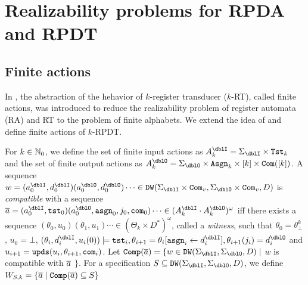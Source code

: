 \section{Realizability problems for RPDA and RPDT}


\subsection{Finite actions}
In \cite{EFR19}, the abstraction of the hehavior of $k$-register transducer ($k$-RT), called finite actions, was introduced
to reduce the realizability problem of register automata (RA) and RT to
the problem of finite alphabets.
We extend the idea of \cite{EFR19} and define finite actions of $k$-RPDT.

For $k\in\mathbb{N}_0$,
we define the set of finite input actions as $A_k^\dblI = \Sigma_\dblI\times \Tst_k$
and the set of finite output actions as $A_k^\dblO = \Sigma_\dblO\times \Asgn_k\times [k]\times \Com([k])$.
A sequence $w = (a^\dblI_0,d^\dblI_0) (a^\dblO_0,d^\dblO_0)\cdots \in \DW(\Sigma_\dblI\times\Com_v,\Sigma_\dblO\times\Com_v,D)$ is \emph{compatible} with a sequence
$\overa = (a^\dblI_0, \tst_0)(a^\dblO_0,\asgn_0,j_0, \com_0)\cdots \in (A_k^\dblI\cdot A_k^\dblO)^\omega$
iff there exists a sequence $(\theta_0,u_0)(\theta_1, u_1)\cdots\in (\Theta_k\times D^*)^\omega$, called a \emph{witness}, such that
$\theta_0 = \theta^{k}_\bot$, $u_0 = \bot$,
$(\theta_i, d^\dblI_i, u_i(0)) \models \tst_i, \theta_{i+1}=\theta_i[\asgn_i\leftarrow d^\dblI_i], \theta_{i+1}(j_i) = d^\dblO_i$ and $u_{i+1}=\mathtt{upds}(u_i,\theta_{i+1},\mathtt{com}_i)$.
Let $\Comp(\overa) = \{w\in \DW(\Sigma_\dblI,\Sigma_\dblO,D)\mid$ $w$ is compatible with ${\overline{a}}$ $\}$.
For a specification $S \subseteq \DW(\Sigma_\dblI,\Sigma_\dblO,D)$, we define $W_{S,k}=\{{\overline{a}}\mid {\mathtt{Comp}}({\overline{a}})\subseteq S\}$

